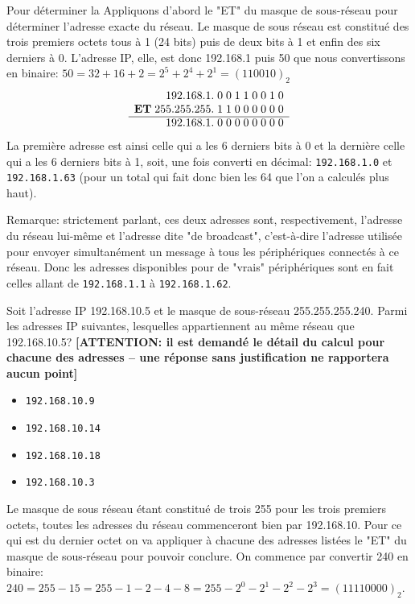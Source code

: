 \documentclass[11pt,a4paper]{exam}
\begin{document}
\begin{questions}
\begin{spacing}{1}
\begin{solution}
        	Pour déterminer la Appliquons d'abord le "ET" du masque de sous-réseau pour déterminer l'adresse exacte du réseau. Le masque de sous réseau est constitué des trois premiers octets tous à 1 (24 bits) puis de deux bits à 1 et enfin des six derniers à 0. L'adresse IP, elle, est donc 192.168.1 puis 50 que nous convertissons en binaire: $50 = 32 + 16 + 2 = 2^5 + 2^4 + 2^1 = (110010)_2$
        	\[
        	\begin{array}{r *{9}{@{\;}r}}
        		 & 192.168.1. & 0 & 0 & 1 & 1 & 0 & 0 & 1 & 0\\
        		\textbf{ET} & 255.255.255. & 1 & 1 & 0 & 0 & 0 & 0 & 0 & 0 \\
        		\cline{1-10}
        		& 192.168.1. & 0 & 0 & 0 & 0 & 0 & 0 & 0 & 0\\
        	\end{array}
        	\]
        	La première adresse est ainsi celle qui a les 6 derniers bits à 0 et la dernière celle qui a les 6 derniers bits à 1, soit, une fois converti en décimal: \texttt{192.168.1.0} et \texttt{192.168.1.63} (pour un total qui fait donc bien les 64 que l'on a calculés plus haut).
        	
        	Remarque: strictement parlant, ces deux adresses sont, respectivement, l'adresse du réseau lui-même et l'adresse dite "de broadcast", c'est-à-dire l'adresse utilisée pour envoyer simultanément un message à tous les périphériques connectés à ce réseau. Donc les adresses disponibles pour de "vrais" périphériques sont en fait celles allant de \texttt{192.168.1.1} à \texttt{192.168.1.62}.
        \end{solution}
		
		
		Soit l'adresse IP 192.168.10.5 et le masque de sous-réseau 255.255.255.240. Parmi les adresses IP suivantes, lesquelles appartiennent au même réseau que 192.168.10.5? \textbf{[ATTENTION: il est demandé le détail du calcul pour chacune des adresses -- une réponse sans justification ne rapportera aucun point]}
		\begin{itemize}
			\item \texttt{192.168.10.9}
			\item \texttt{192.168.10.14}
			\item \texttt{192.168.10.18}
			\item \texttt{192.168.10.3}
		\end{itemize}
		\begin{solution}
			Le masque de sous réseau étant constitué de trois 255 pour les trois premiers octets, toutes les adresses du réseau commenceront bien par 192.168.10. Pour ce qui est du dernier octet on va appliquer à chacune des adresses listées le "ET" du masque de sous-réseau pour pouvoir conclure. On commence par convertir 240 en binaire: $240 = 255 - 15 = 255 - 1 - 2 - 4 - 8 = 255 - 2^0 - 2^1 - 2^2 - 2^3 = (11110000)_2$.
			

\end{solution}
\end{spacing}
\end{questions}
\end{document}
